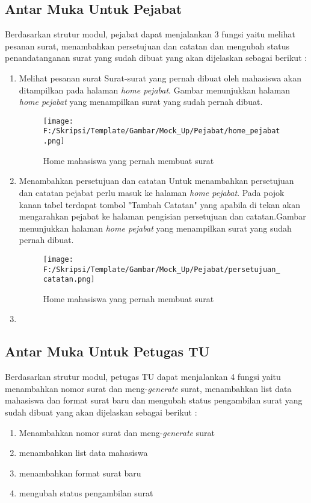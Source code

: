 \subsection{Antar Muka Untuk Pejabat}
\label{sec:antar_muka_pejabat}
Berdasarkan strutur modul, pejabat dapat menjalankan 3 fungsi yaitu melihat pesanan surat, menambahkan persetujuan dan catatan dan mengubah status penandatanganan surat yang sudah dibuat yang akan dijelaskan sebagai berikut :
\begin{enumerate}
	\item Melihat pesanan surat
	Surat-surat yang pernah dibuat oleh mahasiswa akan ditampilkan pada halaman \textit{home pejabat}. Gambar menunjukkan halaman \textit{home pejabat} yang menampilkan surat yang sudah pernah dibuat.
	\begin{figure}[H]
	\centering
		\texttt{[image: F:/Skripsi/Template/Gambar/Mock\_Up/Pejabat/home\_pejabat.png]}
		\caption{Home mahasiswa yang pernah membuat surat}
		\label{fig:home_mahasiswa_yang_pernah_membuat_surat}
	\end{figure}
	
	\item Menambahkan persetujuan dan catatan
	Untuk menambahkan persetujuan dan catatan pejabat perlu masuk ke halaman \textit{home pejabat}. Pada pojok kanan tabel terdapat tombol "Tambah Catatan" yang apabila di tekan akan mengarahkan pejabat ke halaman pengisian persetujuan dan catatan.Gambar menunjukkan halaman \textit{home pejabat} yang menampilkan surat yang sudah pernah dibuat.
	\begin{figure}[H]
	\centering
		\texttt{[image: F:/Skripsi/Template/Gambar/Mock\_Up/Pejabat/persetujuan\_catatan.png]}
		\caption{Home mahasiswa yang pernah membuat surat}
		\label{fig:home_mahasiswa_yang_pernah_membuat_surat}
	\end{figure}
	
	\item
\end{enumerate}
\subsection{Antar Muka Untuk Petugas TU}
\label{sec:antar_muka_petugas_tu}
Berdasarkan strutur modul, petugas TU dapat menjalankan 4 fungsi yaitu menambahkan nomor surat dan meng-\textit{generate} surat, menambahkan list data mahasiswa dan format surat baru dan mengubah status pengambilan surat yang sudah dibuat yang akan dijelaskan sebagai berikut :
\begin{enumerate}
	\item Menambahkan nomor surat dan meng-\textit{generate} surat
	\item menambahkan list data mahasiswa
	\item menambahkan format surat baru
	\item mengubah status pengambilan surat
\end{enumerate}